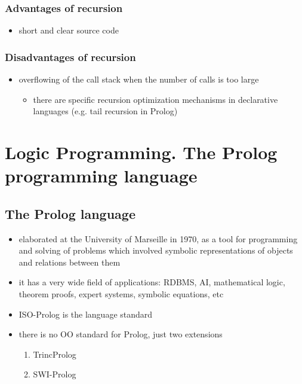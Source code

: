 \documentclass[11pt]{article}
\begin{document}
\subsubsection{Advantages of recursion}
\label{sec:org8342913}
\begin{itemize}
\item short and clear source code
\end{itemize}
\subsubsection{Disadvantages of recursion}
\label{sec:org2e65bd3}
\begin{itemize}
\item overflowing of the call stack when the number of calls is too large
\begin{itemize}
\item there are specific recursion optimization mechanisms in declarative languages (e.g. tail recursion in Prolog)
\end{itemize}
\end{itemize}
\section{Logic Programming. The Prolog programming language}
\label{sec:orgefc0e4b}
\subsection{The Prolog language}
\label{sec:orgaa1061c}
\begin{itemize}
\item elaborated at the University of Marseille in 1970, as a tool for programming and solving of problems which involved symbolic representations of objects and relations between them
\item it has a very wide field of applications: RDBMS, AI, mathematical logic, theorem proofs, expert systems, symbolic equations, etc
\item ISO-Prolog is the language standard
\item there is no OO standard for Prolog, just two extensions
\begin{enumerate}
\item TrincProlog
\item SWI-Prolog
\end{enumerate}
\end{itemize}
\end{document}
